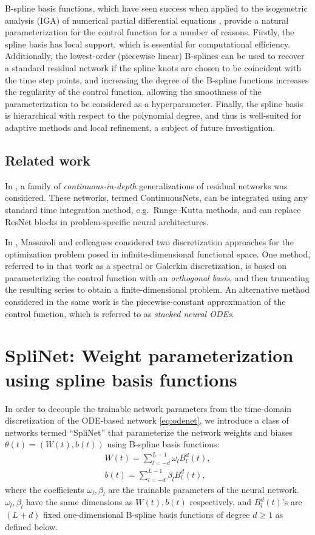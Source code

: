 \documentclass[12pt]{amsart}
\begin{document}
B-spline basis functions, which have seen success when applied to the isogemetric analysis (IGA) of numerical partial differential equations \cite{Cottrell2009}, provide a natural parameterization for the control function for a number of reasons.
Firstly, the spline basis has local support, which is essential for computational efficiency.
Additionally, the lowest-order (piecewise linear) B-splines can be used to recover a standard residual network if the spline knots are chosen to be coincident with the time step points, and increasing the degree of the B-spline functions increases the regularity of the control function, allowing the smoothness of the parameterization to be considered as a hyperparameter.
Finally, the spline basis is hierarchical with respect to the polynomial degree, and thus is well-suited for adaptive methods and local refinement, a subject of future investigation.


\subsection{Related work}

In \cite{queiruga2020continuous}, a family of \textit{continuous-in-depth} generalizations of residual networks was considered.
These networks, termed ContinuousNets, can be integrated using any standard time integration method, e.g.\ Runge--Kutta methods, and can replace ResNet blocks in problem-specific neural architectures.

In \cite{massaroli2020dissecting}, Massaroli and colleagues considered two discretization approaches for the optimization problem posed in infinite-dimensional functional space.
One method, referred to in that work as a spectral or Galerkin discretization, is based on parameterizing the control function with an \textit{orthogonal basis}, and then truncating the resulting series to obtain a finite-dimensional problem.
An alternative method considered in the same work is the piecewise-constant approximation of the control function, which is referred to as \textit{stacked neural ODEs}.



\section{SpliNet: Weight parameterization using spline basis functions} \label{sec:splines}

In order to decouple the trainable network parameters from the time-domain discretization of the ODE-based network \eqref{eq:odenet}, we introduce a class of networks termed ``SpliNet'' that parameterize the network weights and biases $\theta(t) = (W(t), b(t))$ using B-spline basis functions:
    \begin{align}
        W(t) = \sum_{l=-d}^{L-1} \omega_l B^d_l(t),\\
        b(t) = \sum_{l=-d}^{L-1} \beta_l B^d_l(t),
    \end{align}
    where the coefficients $\omega_l, \beta_l$ are the trainable parameters of the neural network.
    $\omega_l, \beta_l$ have the same dimensions as $W(t), b(t)$ respectively, and $B^d_l(t)$'s are $(L+d)$ fixed one-dimensional B-spline basis functions of degree $d\geq 1$ as defined below.
\end{document}
